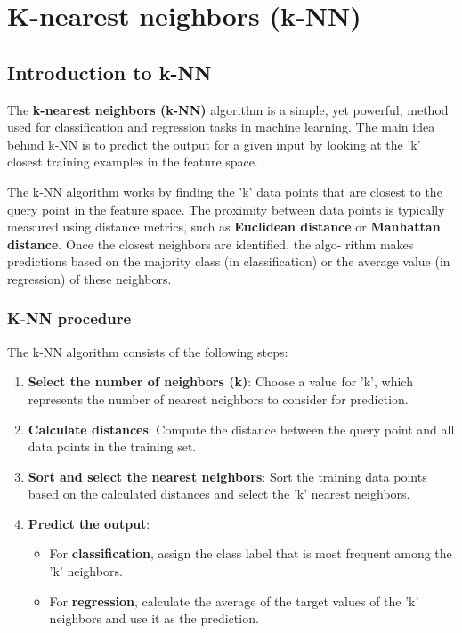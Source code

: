 \chapter{K-nearest neighbors (k-NN)}
\label{chap:ch3-knn}

\section{Introduction to k-NN}
\label{sec:ch3-intro}

The \textbf{k-nearest neighbors (k-NN)} algorithm is a simple, yet powerful, method
used for classification and regression tasks in machine learning. The main idea
behind k-NN is to predict the output for a given input by looking at the 'k'
closest training examples in the feature space.

The k-NN algorithm works by finding the 'k' data points that are closest
to the query point in the feature space. The proximity between data points
is typically measured using distance metrics, such as \textbf{Euclidean distance} or
\textbf{Manhattan distance}. Once the closest neighbors are identified, the algo-
rithm makes predictions based on the majority class (in classification) or
the average value (in regression) of these neighbors.

\subsection{K-NN procedure}
\label{sec:ch3-knn-procedure}

The k-NN algorithm consists of the following steps:
\begin{enumerate}
  \item \textbf{Select the number of neighbors (k)}: Choose a value for 'k', which
    represents the number of nearest neighbors to consider for prediction.
  \item \textbf{Calculate distances}: Compute the distance between the query point
    and all data points in the training set.
  \item \textbf{Sort and select the nearest neighbors}: Sort the training data points
    based on the calculated distances and select the 'k' nearest neighbors.
  \item \textbf{Predict the output}:
    \begin{itemize}
      \item For \textbf{classification}, assign the class label that is most frequent
        among the 'k' neighbors.
      \item For \textbf{regression}, calculate the average of the target values of the 'k'
        neighbors and use it as the prediction.
    \end{itemize}
\end{enumerate}

